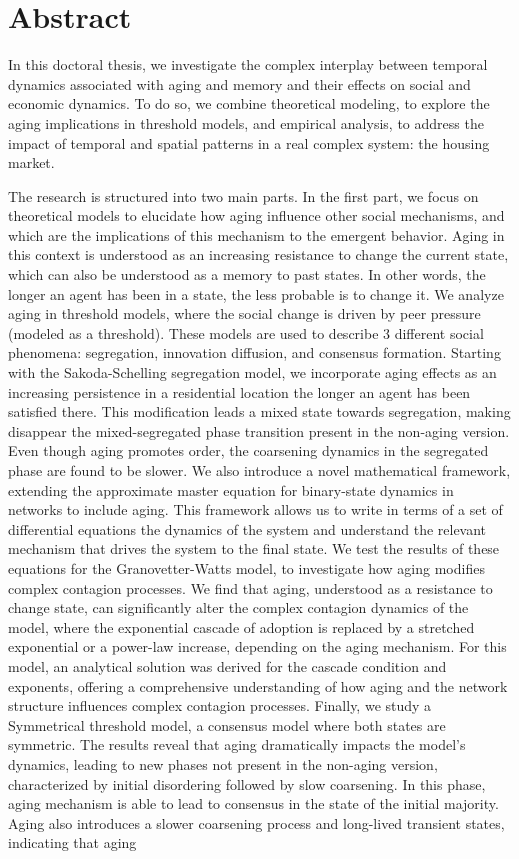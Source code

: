 \pagebreak
\thispagestyle{empty}
\section*{Abstract}

In this doctoral thesis, we investigate the complex interplay between temporal dynamics associated with aging and memory and their effects on social and economic dynamics. To do so, we combine theoretical modeling, to explore the aging implications in threshold models, and empirical analysis, to address the impact of temporal and spatial patterns in a real complex system: the housing market. 

The research is structured into two main parts. In the first part, we focus on theoretical models to elucidate how aging influence other social mechanisms, and which are the implications of this mechanism to the emergent behavior. Aging in this context is understood as an increasing resistance to change the current state, which can also be understood as a memory to past states. In other words, the longer an agent has been in a state, the less probable is to change it. We analyze aging in threshold models, where the social change is driven by peer pressure (modeled as a threshold). These models are used to describe 3 different social phenomena: segregation, innovation diffusion, and consensus formation. Starting with the Sakoda-Schelling segregation model, we incorporate aging effects as an increasing persistence in a residential location the longer an agent has been satisfied there. This modification leads a mixed state towards segregation, making disappear the mixed-segregated phase transition present in the non-aging version. Even though aging promotes order, the coarsening dynamics in the segregated phase are found to be slower. We also introduce a novel mathematical framework, extending the approximate master equation for binary-state dynamics in networks to include aging. This framework allows us to write in terms of a set of differential equations the dynamics of the system and understand the relevant mechanism that drives the system to the final state. We test the results of these equations for the Granovetter-Watts model, to investigate how aging modifies complex contagion processes. We find that aging, understood as a resistance to change state, can significantly alter the complex contagion dynamics of the model, where the exponential cascade of adoption is replaced by a stretched exponential or a power-law increase, depending on the aging mechanism. For this model, an analytical solution was derived for the cascade condition and exponents, offering a comprehensive understanding of how aging and the network structure influences complex contagion processes. Finally, we study a Symmetrical threshold model, a consensus model where both states are symmetric. The results reveal that aging dramatically impacts the model's dynamics, leading to new phases not present in the non-aging version, characterized by initial disordering followed by slow coarsening. In this phase, aging mechanism is able to lead to consensus in the state of the initial majority. Aging also introduces a slower coarsening process and long-lived transient states, indicating that aging 